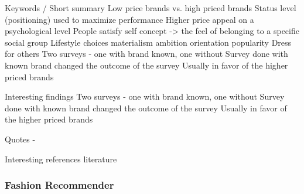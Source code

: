 Keywords / Short summary
    Low price brands vs. high priced brands
        Status level (positioning) used to maximize performance
        Higher price appeal on a psychological level
        People satisfy self concept -> the feel of belonging to a specific social group
        Lifestyle choices
            materialism
            ambition
            orientation
            popularity
        Dress for others
        Two surveys - one with brand known, one without
            Survey done with known brand changed the outcome of the survey
            Usually in favor of the higher priced brands


Interesting findings
    Two surveys - one with brand known, one without
        Survey done with known brand changed the outcome of the survey
        Usually in favor of the higher priced brands

Quotes
-

Interesting references literature






\subsubsection{Fashion Recommender}

